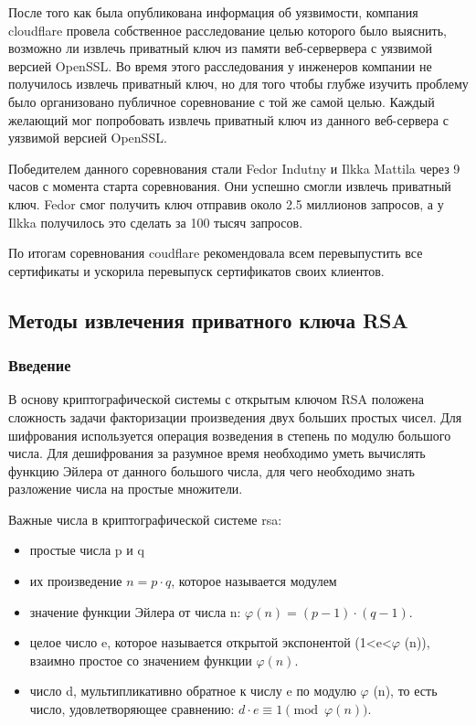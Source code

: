 \documentclass[20pt]{article}
\begin{document}
После того как была опубликована информация об уязвимости, компания cloudflare
провела собственное расследование \cite{heartbleed/investigation} целью которого
было выяснить, возможно ли извлечь приватный ключ из памяти веб-сервервера с
уязвимой версией OpenSSL. Во время этого расследования у инженеров компании не
получилось извлечь приватный ключ, но для того чтобы глубже изучить проблему
было организовано публичное соревнование \cite{heartbleed/investigation} с той же
самой целью. Каждый желающий мог попробовать извлечь приватный ключ из
данного веб-сервера с уязвимой версией OpenSSL.

Победителем данного соревнования стали Fedor Indutny \cite{heartbleed/Indutny} и
Ilkka Mattila через 9 часов с момента старта соревнования. Они успешно смогли
извлечь приватный ключ. Fedor смог получить ключ отправив около 2.5 миллионов
запросов, а у Ilkka получилось это сделать за 100 тысяч запросов.

По итогам соревнования coudflare рекомендовала всем перевыпустить все сертификаты
и ускорила перевыпуск сертификатов своих клиентов.

\subsection{Методы извлечения приватного ключа RSA \cite{playing-hide-and-seek-with-stored-keys} }

\subsubsection{Введение}

В основу криптографической системы с открытым ключом RSA положена сложность задачи
факторизации произведения двух больших простых чисел. Для шифрования используется
операция возведения в степень по модулю большого числа. Для дешифрования за
разумное время необходимо уметь вычислять функцию Эйлера от данного большого
числа, для чего необходимо знать разложение числа на простые множители.

Важные числа в криптографической системе rsa:
\begin{itemize}
  \item простые числа p и q
  \item их произведение $n=p \cdot q$, которое называется модулем
  \item значение функции Эйлера от числа n: $\varphi (n)=(p-1)\cdot (q-1)$.
  \item целое число e, которое называется открытой экспонентой
    (1<e<$\varphi$ (n)), взаимно простое со значением функции $\varphi(n)$.
  \item число d, мультипликативно обратное к числу e по модулю
    $\varphi$ (n), то есть число, удовлетворяющее сравнению: $d\cdot e\equiv 1{\pmod {\varphi (n)}}$.
\end{itemize}
\end{document}
